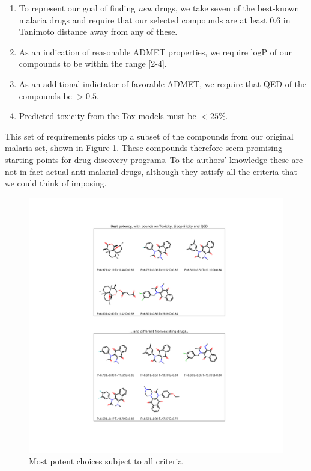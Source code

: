 \documentclass{article}
\begin{document}
\begin{enumerate}
    \item To represent our goal of finding \textit{new} drugs, we take seven of the best-known malaria drugs and require that our selected compounds are at least 0.6 in Tanimoto distance away from any of these.
    \item As an indication of reasonable ADMET properties, we require logP of our compounds to be within the range [2-4]\cite{Hansch1971}.
    \item As an additional indictator of favorable ADMET, we require that QED of the compounds be $> 0.5$.
    \item Predicted toxicity from the Tox models must be $< 25\%$.
\end{enumerate}

This set of requirements picks up a subset of the compounds from our original malaria set, shown in Figure \ref{fig:best_in_data}.  These compounds therefore seem promising starting points for drug discovery programs. To the authors' knowledge these are not in fact actual anti-malarial drugs, although they satisfy all the criteria that we could think of imposing.


\begin{figure}[h!]
\centering
\includegraphics[width=\textwidth]{fig7.png}
\caption{Most potent choices subject to all criteria}
\label{fig:best_in_data}
\end{figure}
\end{document}
